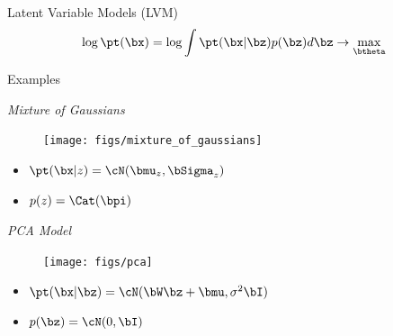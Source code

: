 \documentclass{beamer}
\begin{document}
\begin{frame}{Latent Variable Models (LVM)}
	\[
		\log \pt(\bx) = \log \int \pt(\bx | \bz) p(\bz) d\bz \rightarrow \max_{\btheta}
	\]
    \eqpause
	\vspace{-0.6cm}
	\begin{block}{Examples}
		\begin{minipage}[t]{0.45\columnwidth}
			\textit{Mixture of Gaussians} \\
			\vspace{-0.5cm}
			\begin{figure}
				\centering
				\texttt{[image: figs/mixture\_of\_gaussians]}
			\end{figure}
			\vspace{-0.5cm}
			\begin{itemize}
				\item $\pt(\bx | z) = \cN(\bmu_z, \bSigma_z)$
				\item $p(z) = \Cat(\bpi)$
			\end{itemize}
		\end{minipage}%
        \eqpause
		\begin{minipage}[t]{0.53\columnwidth}
			\textit{PCA Model} \\
			\vspace{-0.5cm}
			\begin{figure}
				\centering
				\texttt{[image: figs/pca]}
			\end{figure}
			\vspace{-0.3cm}
			\begin{itemize}
				\item $\pt(\bx | \bz) = \cN(\bW \bz + \bmu, \sigma^2 \bI)$
				\item $p(\bz) = \cN(0, \bI)$
			\end{itemize}
		\end{minipage}
	\end{block}
\end{frame}
\end{document}
